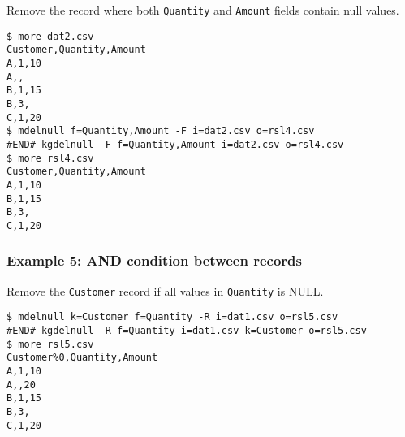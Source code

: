 Remove the record where both \verb|Quantity| and \verb|Amount| fields contain null values.


\begin{Verbatim}[baselinestretch=0.7,frame=single]
$ more dat2.csv
Customer,Quantity,Amount
A,1,10
A,,
B,1,15
B,3,
C,1,20
$ mdelnull f=Quantity,Amount -F i=dat2.csv o=rsl4.csv
#END# kgdelnull -F f=Quantity,Amount i=dat2.csv o=rsl4.csv
$ more rsl4.csv
Customer,Quantity,Amount
A,1,10
B,1,15
B,3,
C,1,20
\end{Verbatim}
\subsubsection*{Example 5: AND condition between records}

Remove the \verb|Customer| record if all values in \verb|Quantity| is NULL.


\begin{Verbatim}[baselinestretch=0.7,frame=single]
$ mdelnull k=Customer f=Quantity -R i=dat1.csv o=rsl5.csv
#END# kgdelnull -R f=Quantity i=dat1.csv k=Customer o=rsl5.csv
$ more rsl5.csv
Customer%0,Quantity,Amount
A,1,10
A,,20
B,1,15
B,3,
C,1,20
\end{Verbatim}
